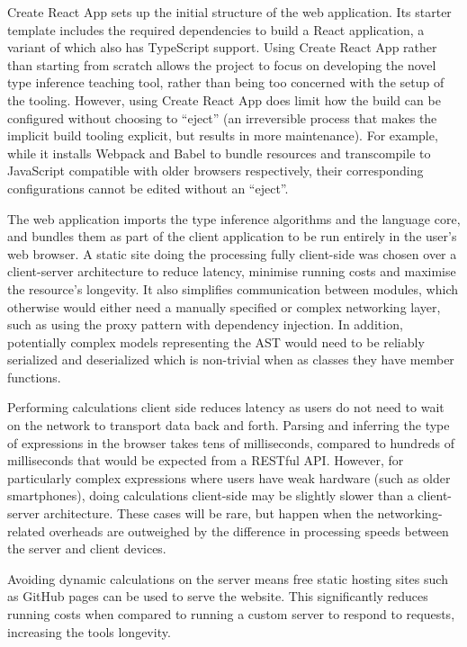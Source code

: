 \documentclass[a4paper,fleqn,oneside,12pt]{report}
\begin{document}
Create React App sets up the initial structure of the web application. Its starter template includes the required dependencies to build a React application, a variant of which also has TypeScript support. Using Create React App rather than starting from scratch allows the project to focus on developing the novel type inference teaching tool, rather than being too concerned with the setup of the tooling. However, using Create React App does limit how the build can be configured without choosing to ``eject'' (an irreversible process that makes the implicit build tooling explicit, but results in more maintenance). For example, while it installs Webpack and Babel to bundle resources and transcompile to JavaScript compatible with older browsers respectively, their corresponding configurations cannot be edited without an ``eject''.

The web application imports the type inference algorithms and the language core, and bundles them as part of the client application to be run entirely in the user’s web browser. A static site doing the processing fully client-side was chosen over a client-server architecture to reduce latency, minimise running costs and maximise the resource’s longevity. It also simplifies communication between modules, which otherwise would either need a manually specified or complex networking layer, such as using the proxy pattern with dependency injection. In addition, potentially complex models representing the AST would need to be reliably serialized and deserialized which is non-trivial when as classes they have member functions.

Performing calculations client side reduces latency as users do not need to wait on the network to transport data back and forth. Parsing and inferring the type of expressions in the browser takes tens of milliseconds, compared to hundreds of milliseconds that would be expected from a RESTful API. However, for particularly complex expressions where users have weak hardware (such as older smartphones), doing calculations client-side may be slightly slower than a client-server architecture. These cases will be rare, but happen when the networking-related overheads are outweighed by the difference in processing speeds between the server and client devices.

Avoiding dynamic calculations on the server means free static hosting sites such as GitHub pages can be used to serve the website. This significantly reduces running costs when compared to running a custom server to respond to requests, increasing the tools longevity.
\end{document}
